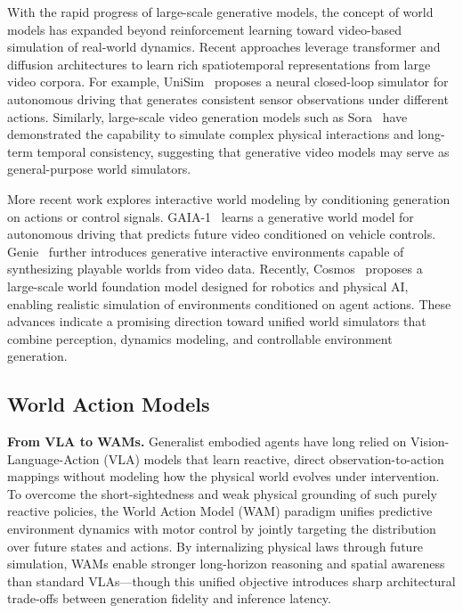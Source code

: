 With the rapid progress of large-scale generative models, the concept of world models has expanded beyond reinforcement learning toward video-based simulation of real-world dynamics. Recent approaches leverage transformer and diffusion architectures to learn rich spatiotemporal representations from large video corpora. For example, UniSim~\cite{yang2023unisim} proposes a neural closed-loop simulator for autonomous driving that generates consistent sensor observations under different actions. Similarly, large-scale video generation models such as Sora~\cite{brooks2024video} have demonstrated the capability to simulate complex physical interactions and long-term temporal consistency, suggesting that generative video models may serve as general-purpose world simulators.

More recent work explores interactive world modeling by conditioning generation on actions \cite{wu2026multiworld} or control signals. GAIA-1~\cite{hu2023gaia} learns a generative world model for autonomous driving that predicts future video conditioned on vehicle controls. Genie~\cite{bruce2024genie} further introduces generative interactive environments capable of synthesizing playable worlds from video data. Recently, Cosmos~\cite{nvidia2025worldsimulationvideofoundation} proposes a large-scale world foundation model designed for robotics and physical AI, enabling realistic simulation of environments conditioned on agent actions. These advances indicate a promising direction toward unified world simulators that combine perception, dynamics modeling, and controllable environment generation.

\subsection{World Action Models}

\textbf{From VLA to WAMs.}
Generalist embodied agents have long relied on Vision-Language-Action (VLA) models that learn reactive, direct observation-to-action mappings without modeling how the physical world evolves under intervention. To overcome the short-sightedness and weak physical grounding of such purely reactive policies, the World Action Model (WAM) paradigm unifies predictive environment dynamics with motor control by jointly targeting the distribution over future states and actions. By internalizing physical laws through future simulation, WAMs enable stronger long-horizon reasoning and spatial awareness than standard VLAs—though this unified objective introduces sharp architectural trade-offs between generation fidelity and inference latency.

